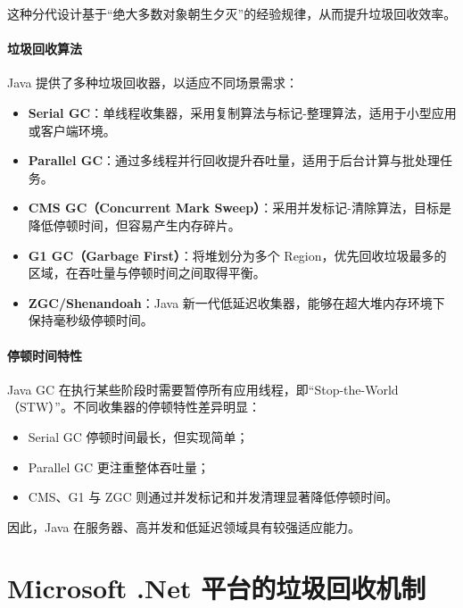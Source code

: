 这种分代设计基于“绝大多数对象朝生夕灭”的经验规律，从而提升垃圾回收效率。

\paragraph{垃圾回收算法}

Java 提供了多种垃圾回收器，以适应不同场景需求：

\begin{itemize}
    \item \textbf{Serial GC}：单线程收集器，采用复制算法与标记-整理算法，适用于小型应用或客户端环境。
    
    \item \textbf{Parallel GC}：通过多线程并行回收提升吞吐量，适用于后台计算与批处理任务。
    
    \item \textbf{CMS GC（Concurrent Mark Sweep）}：采用并发标记-清除算法，目标是降低停顿时间，但容易产生内存碎片。
    
    \item \textbf{G1 GC（Garbage First）}：将堆划分为多个 Region，优先回收垃圾最多的区域，在吞吐量与停顿时间之间取得平衡。
    
    \item \textbf{ZGC/Shenandoah}：Java 新一代低延迟收集器，能够在超大堆内存环境下保持毫秒级停顿时间。
\end{itemize}

\paragraph{停顿时间特性}

Java GC 在执行某些阶段时需要暂停所有应用线程，即“Stop-the-World（STW）”。不同收集器的停顿特性差异明显：

\begin{itemize}
    \item Serial GC 停顿时间最长，但实现简单；
    \item Parallel GC 更注重整体吞吐量；
    \item CMS、G1 与 ZGC 则通过并发标记和并发清理显著降低停顿时间。
\end{itemize}

因此，Java 在服务器、高并发和低延迟领域具有较强适应能力。

\section{Microsoft .Net 平台的垃圾回收机制}

